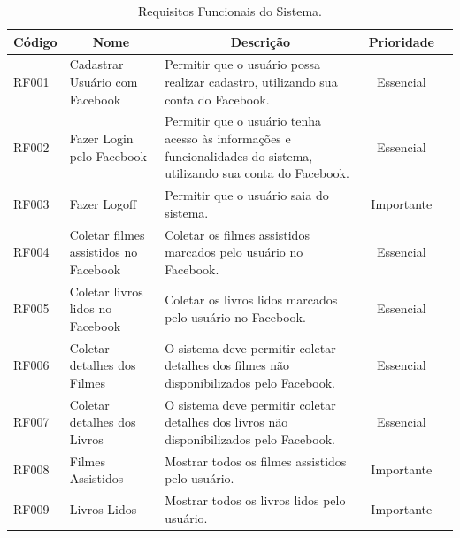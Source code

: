 \begin{table}[H]
	\centering
	\caption{Requisitos Funcionais do Sistema.}
	\label{tab:req-funcionais}
	\def\arraystretch{1.2} %
	\begin{tabular}{|m{1.2cm} | m{3cm} | m{7.2cm}| c | m{1.9cm}}
		\hline
		
		\multicolumn{1}{|c|}{\bfseries Código} & \multicolumn{1}{c|}{\bfseries Nome} & \multicolumn{1}{c|}{\bfseries Descrição} & \multicolumn{1}{c|}{\bfseries Prioridade} \\ \hline
		RF001   & Cadastrar Usuário com Facebook         & Permitir que o usuário possa realizar cadastro, utilizando sua conta do Facebook.                                  & Essencial       \\ \hline
		RF002   & Fazer Login pelo Facebook              & Permitir que o usuário tenha acesso às informações e funcionalidades do sistema, utilizando sua conta do Facebook. & Essencial       \\ \hline
		RF003   & Fazer Logoff                           & Permitir que o usuário saia do sistema.                                                                            & Importante      \\ \hline
		RF004   & Coletar filmes assistidos no Facebook   & Coletar os filmes assistidos marcados pelo usuário no Facebook.                                                    & Essencial       \\ \hline
		RF005   & Coletar livros lidos no Facebook       & Coletar os livros lidos marcados pelo usuário no Facebook.                                                         & Essencial       \\ \hline
		RF006   & Coletar detalhes dos Filmes            & O sistema deve permitir coletar detalhes dos filmes não disponibilizados pelo Facebook.                            & Essencial       \\ \hline
		RF007   & Coletar detalhes dos Livros            & O sistema deve permitir coletar detalhes dos livros não disponibilizados pelo Facebook.                            & Essencial       \\ \hline
		RF008   & Filmes Assistidos                      & Mostrar todos os filmes assistidos pelo usuário.                                                                   & Importante      \\ \hline
		RF009   & Livros Lidos                           & Mostrar todos os livros lidos pelo usuário.                                                                        & Importante      \\ \hline

\end{tabular}
\end{table}
